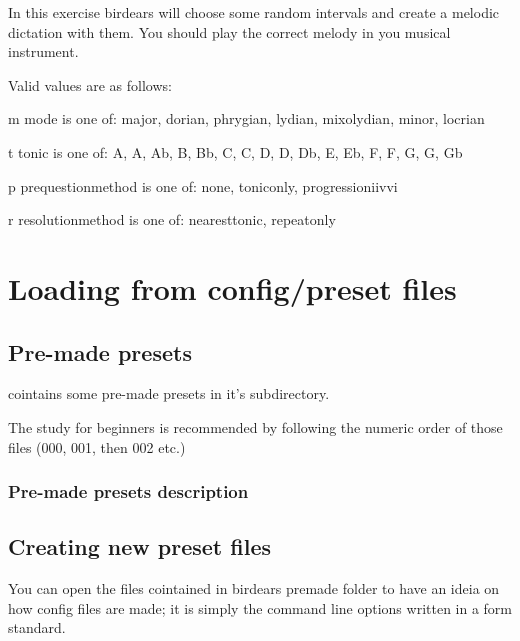 \documentclass[letterpaper,10pt,english]{sphinxmanual}
\begin{document}
\begin{sphinxVerbatim}[commandchars=\\\{\}]
  In this exercise birdears will choose some random intervals and create a
  melodic dictation with them. You should play the correct melody in you
  musical instrument.

  Valid values are as follows:

  \PYGZhy{}m \PYGZlt{}mode\PYGZgt{} is one of: major, dorian, phrygian, lydian, mixolydian, minor,
  locrian

  \PYGZhy{}t \PYGZlt{}tonic\PYGZgt{} is one of: A, A\PYGZsh{}, Ab, B, Bb, C, C\PYGZsh{}, D, D\PYGZsh{}, Db, E, Eb, F, F\PYGZsh{}, G,
  G\PYGZsh{}, Gb

  \PYGZhy{}p \PYGZlt{}prequestion\PYGZus{}method\PYGZgt{} is one of: none, tonic\PYGZus{}only, progression\PYGZus{}i\PYGZus{}iv\PYGZus{}v\PYGZus{}i

  \PYGZhy{}r \PYGZlt{}resolution\PYGZus{}method\PYGZgt{} is one of: nearest\PYGZus{}tonic, repeat\PYGZus{}only
\end{sphinxVerbatim}


\section{Loading from config/preset files}
\label{\detokenize{using:loading-from-config-preset-files}}

\subsection{Pre-made presets}
\label{\detokenize{using:pre-made-presets}}
 cointains some pre-made presets in it’s 
subdirectory.

The study for beginners is recommended by following the numeric order of
those files (000, 001, then 002 etc.)


\subsubsection{Pre-made presets description}
\label{\detokenize{using:pre-made-presets-description}}


\subsection{Creating new preset files}
\label{\detokenize{using:creating-new-preset-files}}
You can open the files cointained in birdears premade 
folder to have an ideia on how config files are made; it is simply the
command line options written in a form  standard.
\end{document}
